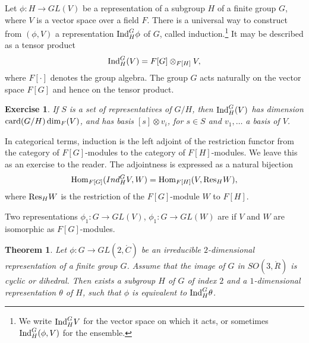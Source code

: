 \documentclass{amsart}
\newtheorem{theorem}[equation]{Theorem}
\newtheorem{exercise}{Exercise}
\begin{document}
Let $\phi:H\to GL(V)$ be a representation of a subgroup $H$ of a
finite group $G$, where $V$ is a vector space over a field $F$.  There
is a universal way to construct from $(\phi,V)$ a representation ${\operatorname{Ind}}_H^G\phi$ of
$G$, called induction.\footnote{We write ${\operatorname{Ind}}_H^G V$ for the vector space on
which it acts, or sometimes ${\operatorname{Ind}}_H^G (\phi,V)$ for the ensemble.}  
It may be described as a tensor product
\[
{\operatorname{Ind}}_H^G(V) = F[G]\otimes_{F[H]} V,
\]
where $F[\cdot]$ denotes the group algebra.  The group $G$ acts
naturally on the vector space $F[G]$ and hence on the tensor product.

\begin{exercise}
If $S$ is a set of representatives of $G/H$, then ${\operatorname{Ind}}_H^G(V)$
has dimension ${\operatorname{card}}(G/H)\dim_F(V)$, and has basis $[s]\otimes v_i$,
for $s\in S$ and $v_1,\ldots $ a basis of $V$.
\end{exercise}

In categorical terms, induction is the left adjoint of the restriction functor
from the category of  $F[G]$-modules to the category of  $F[H]$-modules.
We leave this as an exercise to the reader.  The adjointness is expressed as a 
natural bijection
\begin{equation}\label{eqn:adjoint}
{\operatorname{Hom}}_{F[G]}(Ind_H^G V,W) = {\operatorname{Hom}}_{F[H]}(V,{\operatorname{Res}}_H W),
\end{equation}
where ${\operatorname{Res}}_H W$ is the restriction of the $F[G]$-module $W$ to $F[H]$.

Two representations $\phi_1:G\to GL(V)$, $\phi_1:G\to GL(W)$ are
 if $V$ and $W$ are isomorphic as $F[G]$-modules.

\begin{theorem}
  Let $\phi:G\to GL(2,\ring{C})$ be an irreducible $2$-dimensional
  representation of a finite group $G$.  Assume that the image of $G$
  in $SO(3,\ring{R})$ is cyclic or dihedral.  Then exists a subgroup
  $H$ of $G$ of index $2$ and a $1$-dimensional representation
  $\theta$ of $H$, such that $\phi$ is equivalent to
  ${\operatorname{Ind}}_H^G\theta$.
\end{theorem}
\end{document}
